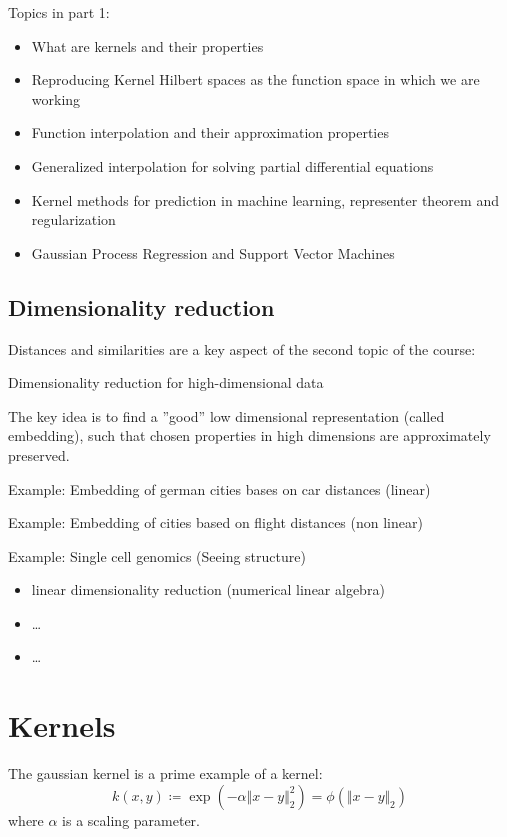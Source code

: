 Topics in part 1:
\begin{itemize}
    \item What are kernels and their properties
    \item Reproducing Kernel Hilbert spaces as the function space in which we are working
    \item Function interpolation and their approximation properties
    \item Generalized interpolation for solving partial differential equations
    \item Kernel methods for prediction in machine learning, representer theorem and regularization
    \item Gaussian Process Regression and Support Vector Machines
\end{itemize}

\subsection{Dimensionality reduction}

Distances and similarities are a key aspect of the second topic of the course:
\begin{center}
    Dimensionality reduction for high-dimensional data
\end{center}

The key idea is to find a ''good'' low dimensional representation (called embedding),
such that chosen properties in high dimensions are approximately preserved.

Example: Embedding of german cities bases on car distances (linear)

Example: Embedding of cities based on flight distances (non linear)

Example: Single cell genomics (Seeing structure)

\begin{itemize}
    \item linear dimensionality reduction (numerical linear algebra)
    \item \dots
    \item \dots 
\end{itemize}

\section{Kernels}

\begin{*definition}
    The gaussian kernel is a prime example of a kernel:
    \[k(x,y)\coloneqq \exp\left(-\alpha\Vert x-y\Vert_2^2\right)=\phi(\Vert x-y\Vert_2)\]
    where $\alpha$ is a scaling parameter.    
\end{*definition}

